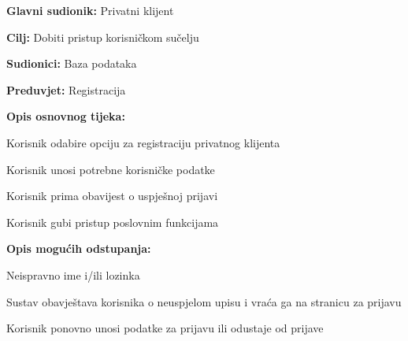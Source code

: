 					\noindent {}
					\begin{packed_item}
						
						\item \textbf{Glavni sudionik: } Privatni klijent
						\item  \textbf{Cilj:} Dobiti pristup korisničkom sučelju
						\item  \textbf{Sudionici:} Baza podataka
						\item  \textbf{Preduvjet:} Registracija
						\item  \textbf{Opis osnovnog tijeka:}
						
						\item[] \begin{packed_enum}
							
							\item Korisnik odabire opciju za registraciju privatnog klijenta
							\item Korisnik unosi potrebne korisničke podatke
							\item Korisnik prima obavijest o uspješnoj prijavi
							\item Korisnik gubi pristup poslovnim funkcijama
						\end{packed_enum}
						
						\item  \textbf{Opis mogućih odstupanja:}
						
						\item[] \begin{packed_item}
							
							\item[2.a]  Neispravno ime i/ili lozinka
							\item[] \begin{packed_enum}
								
								\item Sustav obavještava korisnika o neuspjelom upisu i vraća ga na stranicu za prijavu
								\item Korisnik ponovno unosi podatke za prijavu ili odustaje od prijave
							
							\end{packed_enum}
						\end{packed_item}
					\end{packed_item}
				
